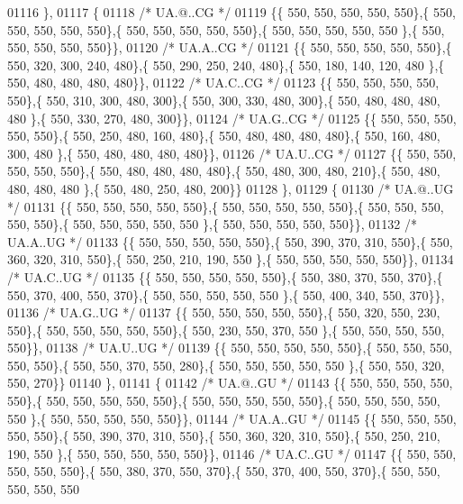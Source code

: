 \begin{DoxyCode}
01116 \},
01117 \{
01118 \textcolor{comment}{/* UA.@..CG */}
01119 \{\{ 550, 550, 550, 550, 550\},\{ 550, 550, 550, 550, 550\},\{ 550, 550, 550, 550, 550\},\{ 550, 550, 550, 550, 550
      \},\{ 550, 550, 550, 550, 550\}\},
01120 \textcolor{comment}{/* UA.A..CG */}
01121 \{\{ 550, 550, 550, 550, 550\},\{ 550, 320, 300, 240, 480\},\{ 550, 290, 250, 240, 480\},\{ 550, 180, 140, 120, 480
      \},\{ 550, 480, 480, 480, 480\}\},
01122 \textcolor{comment}{/* UA.C..CG */}
01123 \{\{ 550, 550, 550, 550, 550\},\{ 550, 310, 300, 480, 300\},\{ 550, 300, 330, 480, 300\},\{ 550, 480, 480, 480, 480
      \},\{ 550, 330, 270, 480, 300\}\},
01124 \textcolor{comment}{/* UA.G..CG */}
01125 \{\{ 550, 550, 550, 550, 550\},\{ 550, 250, 480, 160, 480\},\{ 550, 480, 480, 480, 480\},\{ 550, 160, 480, 300, 480
      \},\{ 550, 480, 480, 480, 480\}\},
01126 \textcolor{comment}{/* UA.U..CG */}
01127 \{\{ 550, 550, 550, 550, 550\},\{ 550, 480, 480, 480, 480\},\{ 550, 480, 300, 480, 210\},\{ 550, 480, 480, 480, 480
      \},\{ 550, 480, 250, 480, 200\}\}
01128 \},
01129 \{
01130 \textcolor{comment}{/* UA.@..UG */}
01131 \{\{ 550, 550, 550, 550, 550\},\{ 550, 550, 550, 550, 550\},\{ 550, 550, 550, 550, 550\},\{ 550, 550, 550, 550, 550
      \},\{ 550, 550, 550, 550, 550\}\},
01132 \textcolor{comment}{/* UA.A..UG */}
01133 \{\{ 550, 550, 550, 550, 550\},\{ 550, 390, 370, 310, 550\},\{ 550, 360, 320, 310, 550\},\{ 550, 250, 210, 190, 550
      \},\{ 550, 550, 550, 550, 550\}\},
01134 \textcolor{comment}{/* UA.C..UG */}
01135 \{\{ 550, 550, 550, 550, 550\},\{ 550, 380, 370, 550, 370\},\{ 550, 370, 400, 550, 370\},\{ 550, 550, 550, 550, 550
      \},\{ 550, 400, 340, 550, 370\}\},
01136 \textcolor{comment}{/* UA.G..UG */}
01137 \{\{ 550, 550, 550, 550, 550\},\{ 550, 320, 550, 230, 550\},\{ 550, 550, 550, 550, 550\},\{ 550, 230, 550, 370, 550
      \},\{ 550, 550, 550, 550, 550\}\},
01138 \textcolor{comment}{/* UA.U..UG */}
01139 \{\{ 550, 550, 550, 550, 550\},\{ 550, 550, 550, 550, 550\},\{ 550, 550, 370, 550, 280\},\{ 550, 550, 550, 550, 550
      \},\{ 550, 550, 320, 550, 270\}\}
01140 \},
01141 \{
01142 \textcolor{comment}{/* UA.@..GU */}
01143 \{\{ 550, 550, 550, 550, 550\},\{ 550, 550, 550, 550, 550\},\{ 550, 550, 550, 550, 550\},\{ 550, 550, 550, 550, 550
      \},\{ 550, 550, 550, 550, 550\}\},
01144 \textcolor{comment}{/* UA.A..GU */}
01145 \{\{ 550, 550, 550, 550, 550\},\{ 550, 390, 370, 310, 550\},\{ 550, 360, 320, 310, 550\},\{ 550, 250, 210, 190, 550
      \},\{ 550, 550, 550, 550, 550\}\},
01146 \textcolor{comment}{/* UA.C..GU */}
01147 \{\{ 550, 550, 550, 550, 550\},\{ 550, 380, 370, 550, 370\},\{ 550, 370, 400, 550, 370\},\{ 550, 550, 550, 550, 550

\end{DoxyCode}
